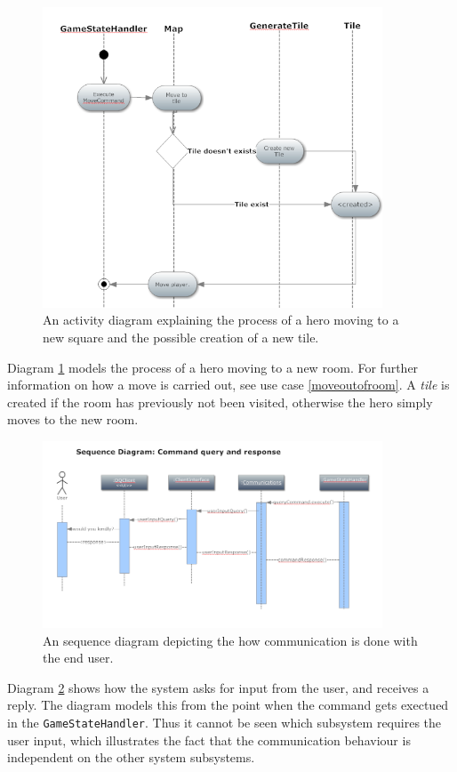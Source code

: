 \begin{figure}[h]
\center
\includegraphics[width=0.9\textwidth]{diagrams/moveActivityDiagram.png}
\caption{An activity diagram explaining the process of a hero moving to a new square and the possible creation of a new tile.}
\label{fig:move_activity_diagram}
\end{figure}

Diagram \ref{fig:move_activity_diagram} models the process of a hero moving to a new room. For further information on how a move is carried out, see use case \ref{moveoutofroom}. A \emph{tile} is created if the room has previously not been visited, otherwise the hero simply moves to the new room.

\begin{figure}[h]
\center
\includegraphics[width=0.9\textwidth]{diagrams/moveCommandSequenceDiagram.png}
\caption{An sequence diagram depicting the how communication is done with the end user.}
\label{fig:randsequence}
\end{figure}

Diagram \ref{fig:randsequence} shows how the system asks for input from the user, and receives a reply. The diagram models this from the point when the command gets exectued in the \texttt{GameStateHandler}. Thus it cannot be seen which subsystem requires the user input, which illustrates the fact that the communication behaviour is independent on the other system subsystems.
